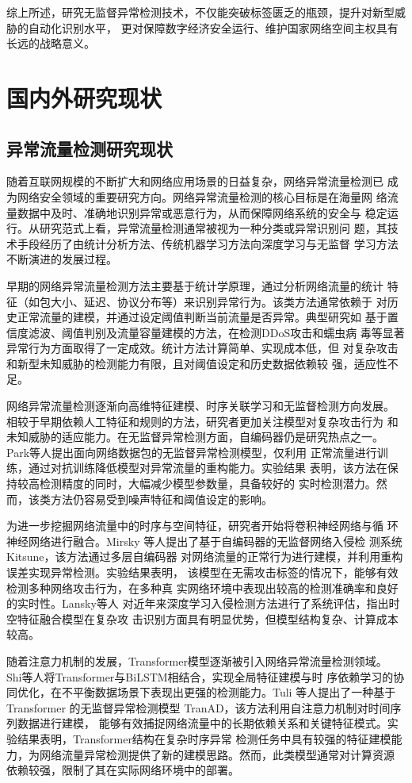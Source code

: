 综上所述，研究无监督异常检测技术，不仅能突破标签匮乏的瓶颈，提升对新型威胁的自动化识别水平，
更对保障数字经济安全运行、维护国家网络空间主权具有长远的战略意义。

\section{国内外研究现状}
\subsection{异常流量检测研究现状}
随着互联网规模的不断扩大和网络应用场景的日益复杂，网络异常流量检测已
成为网络安全领域的重要研究方向。网络异常流量检测的核心目标是在海量网
络流量数据中及时、准确地识别异常或恶意行为，从而保障网络系统的安全与
稳定运行。从研究范式上看，异常流量检测通常被视为一种分类或异常识别问
题，其技术手段经历了由统计分析方法、传统机器学习方法向深度学习与无监督
学习方法不断演进的发展过程。

早期的网络异常流量检测方法主要基于统计学原理，通过分析网络流量的统计
特征（如包大小、延迟、协议分布等）来识别异常行为。该类方法通常依赖于
对历史正常流量的建模，并通过设定阈值判断当前流量是否异常。典型研究如
基于置信度滤波、阈值判别及流量容量建模的方法，在检测DDoS攻击和蠕虫病
毒等显著异常行为方面取得了一定成效。统计方法计算简单、实现成本低，但
对复杂攻击和新型未知威胁的检测能力有限，且对阈值设定和历史数据依赖较
强，适应性不足。

网络异常流量检测逐渐向高维特征建模、时序关联学习和无监督检测方向发展。
相较于早期依赖人工特征和规则的方法，研究者更加关注模型对复杂攻击行为
和未知威胁的适应能力。在无监督异常检测方面，自编码器仍是研究热点之一。
Park等人提出面向网络数据包的无监督异常检测模型\cite{park2025unsupervised}，仅利用
正常流量进行训练，通过对抗训练降低模型对异常流量的重构能力。实验结果
表明，该方法在保持较高检测精度的同时，大幅减少模型参数量，具备较好的
实时检测潜力。然而，该类方法仍容易受到噪声特征和阈值设定的影响。

为进一步挖掘网络流量中的时序与空间特征，研究者开始将卷积神经网络与循
环神经网络进行融合。Mirsky 等人提出了基于自编码器的无监督网络入侵检
测系统 Kitsune\cite{Mirsky2018Kitsune}，该方法通过多层自编码器
对网络流量的正常行为进行建模，并利用重构误差实现异常检测。实验结果表明，
该模型在无需攻击标签的情况下，能够有效检测多种网络攻击行为，在多种真
实网络环境中表现出较高的检测准确率和良好的实时性。Lansky等人\cite{lansky2021deep}
对近年来深度学习入侵检测方法进行了系统评估，指出时空特征融合模型在复杂攻
击识别方面具有明显优势，但模型结构复杂、计算成本较高。

随着注意力机制的发展，Transformer模型逐渐被引入网络异常流量检测领域。
Shi等人\cite{Shi2022TransformerBiLSTM}将Transformer与BiLSTM相结合，实现全局特征建模与时
序依赖学习的协同优化，在不平衡数据场景下表现出更强的检测能力。Tuli 等人提出了一种基于Transformer
的无监督异常检测模型 TranAD\cite{tuli2022tranad}，该方法利用自注意力机制对时间序列数据进行建模，
能够有效捕捉网络流量中的长期依赖关系和关键特征模式。实验结果表明，Transformer结构在复杂时序异常
检测任务中具有较强的特征建模能力，为网络流量异常检测提供了新的建模思路。然而，此类模型通常对计算资源
依赖较强，限制了其在实际网络环境中的部署。

